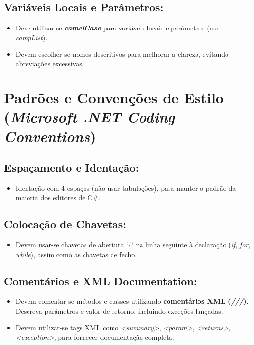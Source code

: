 \documentclass[11pt]{scrartcl} %
\begin{document}
\subsection{Variáveis Locais e Parâmetros:}
\begin{itemize}
	\item Deve utilizar-se \textbf{\textit{camelCase}} para variáveis locais e parâmetros (ex: \textit{campList}).
	\item Devem escolher-se nomes descritivos para melhorar a clareza, evitando abreviações excessivas.
\end{itemize}


\newpage

\section{Padrões e Convenções de Estilo (\textit{Microsoft .NET Coding Conventions})}

\subsection{Espaçamento e Identação:}
\begin{itemize}
	\item Identação com 4 espaços (não usar tabulações), para manter o padrão da maioria dos editores de C\#.
\end{itemize}

\subsection{Colocação de Chavetas:}
\begin{itemize}
	\item Devem usar-se chavetas de abertura ‘\{‘ na linha seguinte à declaração (\textit{if}, \textit{for}, \textit{while}), assim como as chavetas de fecho.
\end{itemize}

\subsection{Comentários e XML Documentation:}
\begin{itemize}
	\item Devem comentar-se métodos e classes utilizando \textbf{comentários XML (\textit{///})}. Descreva parâmetros e valor de retorno, incluindo exceções lançadas.
	\item Devem utilizar-se tags XML como \textit{<summary>}, \textit{<param>}, \textit{<returns>}, \textit{<exception>}, para fornecer documentação completa.
	
\end{itemize}
\end{document}
